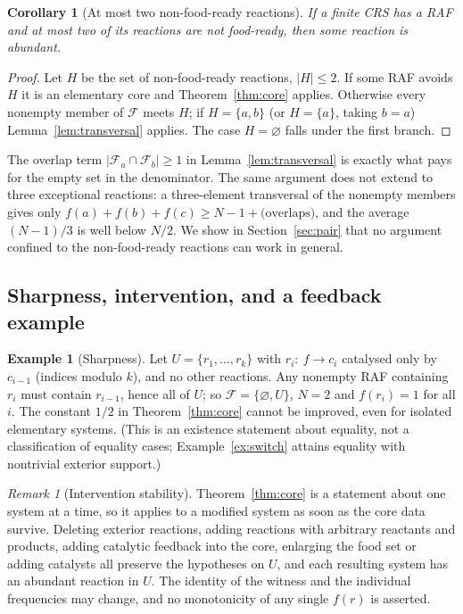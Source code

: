 \documentclass[11pt,a4paper]{article}
\theoremstyle{plain}
\newtheorem{corollary}[theorem]{Corollary}
\theoremstyle{definition}
\newtheorem{example}[theorem]{Example}
\theoremstyle{remark}
\newtheorem{remark}[theorem]{Remark}
\newcommand{\FF}{\mathcal F}
\begin{document}
\begin{corollary}[At most two non-food-ready reactions]\label{cor:two}
If a finite CRS has a RAF and at most two of its reactions are not food-ready, then some
reaction is abundant.
\end{corollary}
\begin{proof}
Let $H$ be the set of non-food-ready reactions, $|H|\le2$. If some RAF avoids $H$ it is an
elementary core and Theorem~\ref{thm:core} applies. Otherwise every nonempty member of $\FF$
meets $H$; if $H=\{a,b\}$ (or $H=\{a\}$, taking $b=a$) Lemma~\ref{lem:transversal} applies.
The case $H=\varnothing$ falls under the first branch.
\end{proof}

The overlap term $|\FF_a\cap\FF_b|\ge1$ in Lemma~\ref{lem:transversal} is exactly what pays
for the empty set in the denominator. The same argument does not extend to three exceptional
reactions: a three-element transversal of the nonempty members gives only
$f(a)+f(b)+f(c)\ge N-1+\text{(overlaps)}$, and the average $(N-1)/3$ is well below $N/2$.
We show in Section~\ref{sec:pair} that no argument confined to the non-food-ready
reactions can work in general.

\subsection{Sharpness, intervention, and a feedback example}

\begin{example}[Sharpness]\label{ex:sharp}
Let $U=\{r_1,\dots,r_k\}$ with $r_i:\ f\to c_i$ catalysed only by $c_{i-1}$ (indices modulo
$k$), and no other reactions. Any nonempty RAF containing $r_i$ must contain $r_{i-1}$, hence
all of $U$; so $\FF=\{\varnothing,U\}$, $N=2$ and $f(r_i)=1$ for all $i$. The constant $1/2$
in Theorem~\ref{thm:core} cannot be improved, even for isolated elementary systems.
(This is an existence statement about equality, not a classification of equality cases;
Example~\ref{ex:switch} attains equality with nontrivial exterior support.)
\end{example}

\begin{remark}[Intervention stability]
Theorem~\ref{thm:core} is a statement about one system at a time, so it applies to a
modified system as soon as the core data survive. Deleting exterior reactions, adding
reactions with arbitrary reactants and products, adding catalytic feedback into the core,
enlarging the food set or adding catalysts all preserve the hypotheses on $U$, and each
resulting system has an abundant reaction in $U$. The identity of the witness and the
individual frequencies may change, and no monotonicity of any single $f(r)$ is asserted.
\end{remark}
\end{document}
